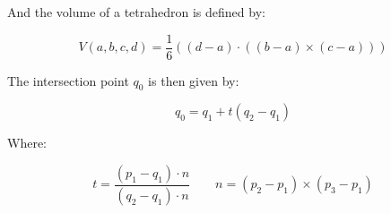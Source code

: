 And the volume of a tetrahedron is defined by:

$$V(a, b, c, d) = \frac{1}{6} \left((d-a) \cdot ((b-a) \times (c-a))\right)$$

The intersection point $q_0$ is then given by:

$$q_0 = q_1 + t (q_2-q_1)$$

Where:

$$t = \frac{(p_1-q_1) \cdot n}{(q_2-q_1) \cdot n} \qquad n = (p_2-p_1) \times (p_3-p_1)$$















